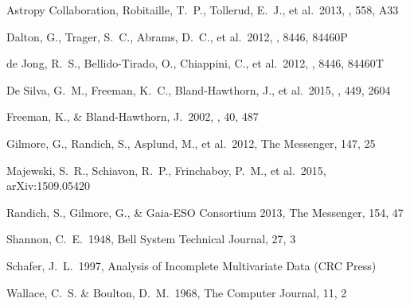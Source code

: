 \documentclass{aastex61}
\begin{document}
\begin{thebibliography}{}




 Astropy Collaboration, Robitaille, T.~P., Tollerud, E.~J., et al.\ 2013, \aap, 558, A33 %

 Dalton, G., Trager, S.~C., Abrams, D.~C., et al.\ 2012, \procspie, 8446, 84460P %

 de Jong, R.~S., Bellido-Tirado, O., Chiappini, C., et al.\ 2012, \procspie, 8446, 84460T %

 De Silva, G.~M., Freeman, K.~C., Bland-Hawthorn, J., et al.\ 2015, \mnras, 449, 2604 %

 Freeman, K., \& Bland-Hawthorn, J.\ 2002, \araa, 40, 487 %

 Gilmore, G., Randich, S., Asplund, M., et al.\ 2012, The Messenger, 147, 25 %

 Majewski, S.~R., Schiavon, R.~P., Frinchaboy, P.~M., et al.\ 2015, arXiv:1509.05420 %

 Randich, S., Gilmore, G., \& Gaia-ESO Consortium 2013, The Messenger, 154, 47 %

 Shannon, C.~E.\ 1948, Bell System Technical Journal, 27, 3 %

 Schafer, J.~L.\ 1997, Analysis of Incomplete Multivariate Data (CRC Press) %

 Wallace, C.~S. \& Boulton, D.~M.\ 1968, The Computer Journal, 11, 2 %

\end{thebibliography}
\end{document}
